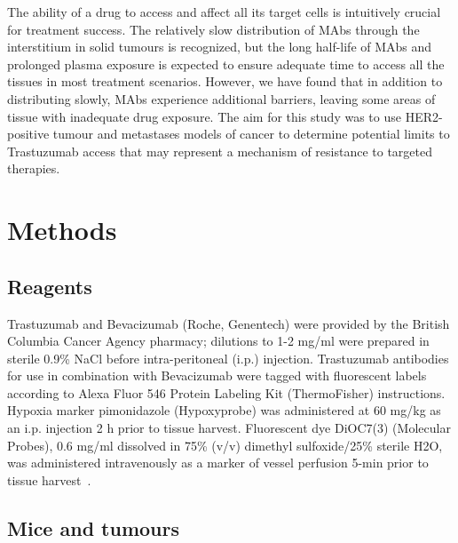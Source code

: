 The ability of a drug to access and affect all its target cells is intuitively crucial for treatment success.
The relatively slow distribution of \acs{MAbs} through the interstitium in solid tumours is recognized, but the long half-life of \acs{MAbs} and prolonged plasma exposure is expected to ensure adequate time to access all the tissues in most treatment scenarios.
However, we have found that in addition to distributing slowly, \acs{MAbs} experience additional barriers, leaving some areas of tissue with inadequate drug exposure.
The aim for this study was to use \acs{HER2}-positive tumour and metastases models of cancer to determine potential limits to Trastuzumab access that may represent a mechanism of resistance to targeted therapies.

\section{Methods}

\subsection{Reagents}

Trastuzumab and Bevacizumab (Roche, Genentech) were provided by the British Columbia Cancer Agency pharmacy; dilutions to 1-2 mg/ml were prepared in sterile 0.9\% NaCl before intra-peritoneal (\acs{i.p.}) injection.
Trastuzumab antibodies for use in combination with Bevacizumab were tagged with fluorescent labels according to Alexa Fluor 546 Protein Labeling Kit (ThermoFisher) instructions.
Hypoxia marker pimonidazole (Hypoxyprobe) was administered at 60 mg/kg as an \acs{i.p.} injection 2 h prior to tissue harvest.
Fluorescent dye DiOC7(3) (Molecular Probes), 0.6 mg/ml dissolved in 75\% (v/v) dimethyl sulfoxide/25\% sterile H2O, was administered intravenously as a marker of vessel perfusion 5-min prior to tissue harvest~\cite{Trotter:1989cs}.

\subsection{Mice and tumours}

